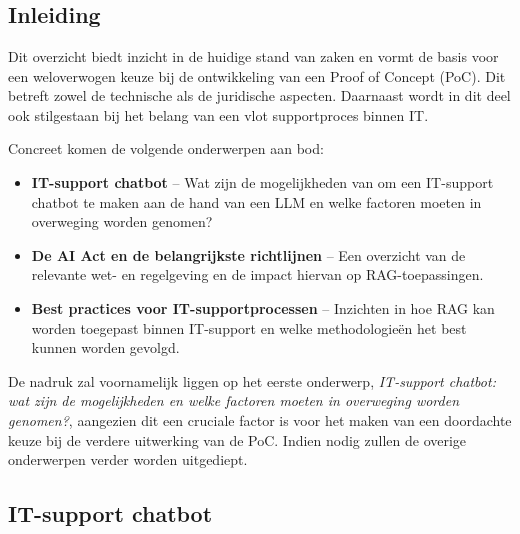 \chapter{}
\label{ch:stand-van-zaken}



\section{Inleiding}
Dit overzicht biedt inzicht in de huidige stand van zaken en vormt de basis voor een weloverwogen keuze bij de ontwikkeling van een Proof of Concept (PoC). Dit betreft zowel de technische als de juridische aspecten. Daarnaast wordt in dit deel ook stilgestaan bij het belang van een vlot supportproces binnen IT.

Concreet komen de volgende onderwerpen aan bod:
\begin{itemize}
    \item \textbf{IT-support chatbot} – Wat zijn de mogelijkheden van om een IT-support chatbot te maken aan de hand van een LLM en welke factoren moeten in overweging worden genomen?
    \item \textbf{De AI Act en de belangrijkste richtlijnen} – Een overzicht van de relevante wet- en regelgeving en de impact hiervan op RAG-toepassingen.
    \item \textbf{Best practices voor IT-supportprocessen} – Inzichten in hoe RAG kan worden toegepast binnen IT-support en welke methodologieën het best kunnen worden gevolgd.
\end{itemize}

De nadruk zal voornamelijk liggen op het eerste onderwerp, \textit{IT-support chatbot: wat zijn de mogelijkheden en welke factoren moeten in overweging worden genomen?}, aangezien dit een cruciale factor is voor het maken van een doordachte keuze bij de verdere uitwerking van de PoC. Indien nodig zullen de overige onderwerpen verder worden uitgediept.

\section{IT-support chatbot}

